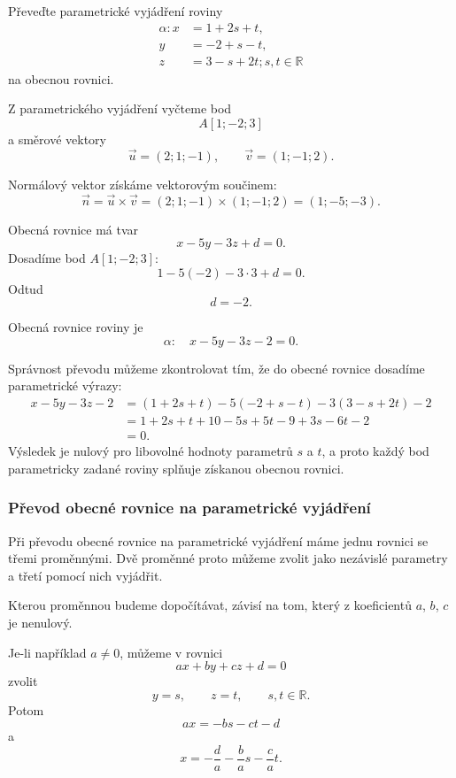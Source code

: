\begin{example}
    \label{exa:Parametric_to_general_plane}
    Převeďte parametrické vyjádření roviny
    \[
        \begin{aligned}
            \alpha: x&=1+2s+t,\\
            y&=-2+s-t,\\
            z&=3-s+2t; s,t\in\mathbb{R}
        \end{aligned}
    \]
    na obecnou rovnici.

    Z parametrického vyjádření vyčteme bod
    \[
        A[1;-2;3]
    \]
    a směrové vektory
    \[
        \vec{u}=(2;1;-1),
        \qquad
        \vec{v}=(1;-1;2).
    \]

    Normálový vektor získáme vektorovým součinem:
    \[
        \vec{n}
        =\vec{u}\times\vec{v}
        =(2;1;-1)\times(1;-1;2)
        =(1;-5;-3).
    \]

    Obecná rovnice má tvar
    \[
        x-5y-3z+d=0.
    \]
    Dosadíme bod $A[1;-2;3]$:
    \[
        1-5(-2)-3\cdot3+d=0.
    \]
    Odtud
    \[
        d=-2.
    \]

    Obecná rovnice roviny je
    \[
        \alpha:\quad x-5y-3z-2=0.
    \]
\end{example}

Správnost převodu můžeme zkontrolovat tím, že do obecné rovnice dosadíme
parametrické výrazy:
\begin{align*}
    x-5y-3z-2
    &=(1+2s+t)-5(-2+s-t)-3(3-s+2t)-2\\
    &=1+2s+t+10-5s+5t-9+3s-6t-2\\
    &=0.
\end{align*}
Výsledek je nulový pro libovolné hodnoty parametrů $s$ a $t$, a proto
každý bod parametricky zadané roviny splňuje získanou obecnou rovnici.

\subsubsection{Převod obecné rovnice na parametrické vyjádření}
\label{subsubsec:General_to_parametric_plane}

Při převodu obecné rovnice na parametrické vyjádření máme jednu rovnici
se třemi proměnnými. Dvě proměnné proto můžeme zvolit jako nezávislé
parametry a třetí pomocí nich vyjádřit.

Kterou proměnnou budeme dopočítávat, závisí na tom, který z koeficientů
$a$, $b$, $c$ je nenulový.

Je-li například $a\neq0$, můžeme v rovnici
\[
    ax+by+cz+d=0
\]
zvolit
\[
    y=s,
    \qquad
    z=t,
    \qquad
    s,t\in\mathbb{R}.
\]
Potom
\[
    ax=-bs-ct-d
\]
a
\[
    x=-\frac{d}{a}-\frac{b}{a}s-\frac{c}{a}t.
\]

